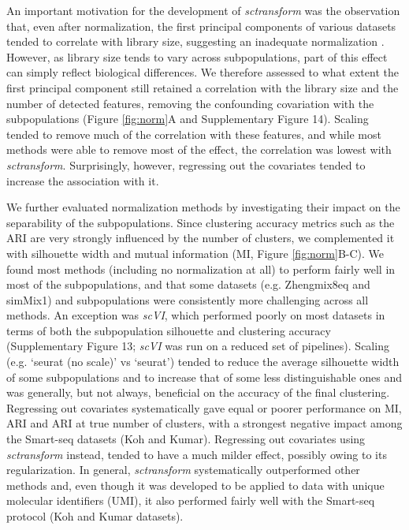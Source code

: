 \documentclass{bmcart}
\begin{document}
An important motivation for the development of \textit{sctransform} was the observation that, even after normalization, the first principal components of various datasets tended to correlate with library size, suggesting an inadequate normalization \cite{hafemeisterSCtransform2019}. However, as library size tends to vary across subpopulations, part of this effect can simply reflect biological differences. We therefore assessed to what extent the first principal component still retained a correlation with the library size and the number of detected features, removing the confounding covariation with the subpopulations (Figure \ref{fig:norm}A and Supplementary Figure 14). Scaling tended to remove much of the correlation with these features, and while most methods were able to remove most of the effect, the correlation was lowest with \textit{sctransform}. Surprisingly, however, regressing out the covariates tended to increase the association with it.

We further evaluated normalization methods by investigating their impact on the separability of the subpopulations. Since clustering accuracy metrics such as the ARI are very strongly influenced by the number of clusters, we complemented it with silhouette width \cite{RousseeuwSil1987} and mutual information (MI, Figure \ref{fig:norm}B-C). We found most methods (including no normalization at all) to perform fairly well in most of the subpopulations{\color{red}, and that some datasets (e.g. Zhengmix8eq and simMix1) and subpopulations were consistently more challenging across all methods. An exception was \textit{scVI}, which performed poorly on most datasets in terms of both the subpopulation silhouette and clustering accuracy (Supplementary Figure 13; \textit{scVI} was run on a reduced set of pipelines). Scaling (e.g. `seurat (no scale)' vs `seurat') tended to reduce the average silhouette width of some subpopulations and to increase that of some less distinguishable ones and was generally, but not always, beneficial on the accuracy of the final clustering. Regressing out covariates systematically gave equal or poorer performance on MI, ARI and ARI at true number of clusters, with a strongest negative impact among the Smart-seq datasets (Koh and Kumar). Regressing out covariates using \textit{sctransform} instead, tended to have a much milder effect, possibly owing to its regularization. In general, \textit{sctransform} systematically outperformed other methods and, even though it was developed to be applied to data with unique molecular identifiers (UMI), it also performed fairly well with the Smart-seq protocol (Koh and Kumar datasets).}
\end{document}
